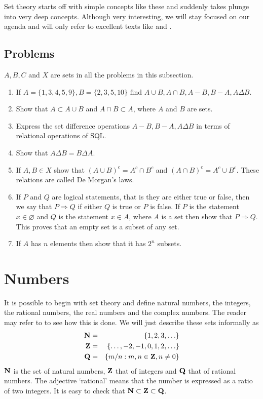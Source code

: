Set theory starts off with simple concepts like these and suddenly takes plunge 
into very deep concepts. Although very interesting, we will stay focused on our
agenda and will only refer to excellent texts like \cite{halmos1960naive} and
\cite{lewis1981elements}.

\subsection{Problems}
$A, B, C$ and $X$ are sets in all the problems in this subsection.
\begin{enumerate}
\item If $A = \{1, 3, 4, 5, 9\}, B = \{2, 3, 5, 10\}$ find $A \cup B, A \cap B,
A - B, B - A, A \Delta B$.
\item Show that $A \subset A \cup B$ and $A \cap B \subset A$, where $A$ and 
$B$ are sets.
\item Express the set difference operations $A - B, B - A, A \Delta B$ in terms 
of relational operations of SQL.
\item Show that $A \Delta B = B \Delta A$.
\item If $A, B \in X$ show that $(A \cup B)^c = A^c \cap B^c$ and $(A \cap B)^c 
= A^c \cup B^c$. These relations are called De Morgan's laws.
\item If $P$ and $Q$ are logical statements, that is they are either true or 
false, then we say that $P \Rightarrow Q$ if either $Q$ is true or $P$ is false.
If $P$ is the statement $x \in \varnothing$ and $Q$ is the statement $x \in A$, 
where $A$ is a set then show that $P \Rightarrow Q$. This proves that an empty 
set is a subset of any set.
\item If $A$ has $n$ elements then show that it has $2^n$ subsets.
\end{enumerate}

\section{Numbers}\label{c1s2}
It is possible to begin with set theory and define natural numbers, the 
integers, the rational numbers, the real numbers and the complex numbers. The 
reader may refer to \cite{tao2009analysis} to see how this is done. We will 
just describe these sets informally as
\begin{eqnarray}
\mathbf{N} &=& \{1, 2, 3, \ldots\} \label{c1s2e1} \\
\mathbf{Z} &=& \{\ldots, -2, -1, 0, 1, 2, \ldots\} \label{c1s2e2} \\
\mathbf{Q} &=& \{m/n : m, n \in \mathbf{Z}, n \ne 0\} \label{c1s2e3} 
\end{eqnarray}
$\mathbf{N}$ is the set of natural numbers, $\mathbf{Z}$ that of integers and $\mathbf{Q}$ that of
rational numbers. The adjective `rational' means that the number is expressed as
a ratio of two integers. It is easy to check that $\mathbf{N} \subset \mathbf{Z} \subset 
\mathbf{Q}$. 

